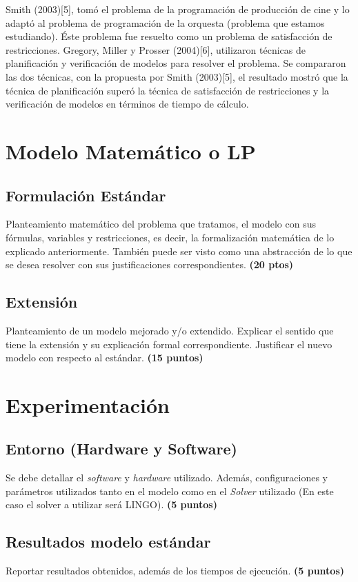 \documentclass[journal, 10pt]{IEEEtran}
\begin{document}
Smith (2003)[5], tomó el problema de la programación de producción de cine y lo adaptó al problema de programación de la orquesta (problema que estamos estudiando). Éste problema fue resuelto como un problema de satisfacción de restricciones. Gregory, Miller y Prosser (2004)[6], utilizaron técnicas de planificación y verificación de modelos para resolver el problema. Se compararon las dos técnicas, con la propuesta por Smith (2003)[5], el resultado mostró que la técnica de planificación superó la técnica de satisfacción de restricciones y la verificación de modelos en términos de tiempo de cálculo.



\section{Modelo Matemático o LP}
\subsection{Formulación Estándar}
Planteamiento matemático del problema que tratamos, el modelo con sus fórmulas, variables y restricciones, es decir, la formalización matemática de lo explicado anteriormente. También puede ser visto como una abstracción de lo que se desea resolver con sus justificaciones correspondientes. \textbf{(20 ptos)}

\subsection{Extensión}
Planteamiento de un modelo mejorado y/o extendido. Explicar el sentido que tiene la extensión y su explicación formal correspondiente. Justificar el nuevo modelo con respecto al estándar. \textbf{(15 puntos)}

\section{Experimentación}
\subsection{Entorno (Hardware y Software)}
Se debe detallar el \textit{software} y \textit{hardware} utilizado. Además, configuraciones y parámetros utilizados tanto en el modelo como en el \textit{Solver} utilizado (En este caso el solver a utilizar será LINGO). \textbf{(5 puntos)}
\subsection{Resultados modelo estándar} 
Reportar resultados obtenidos, además de los tiempos de ejecución. \textbf{(5 puntos)}
\end{document}
